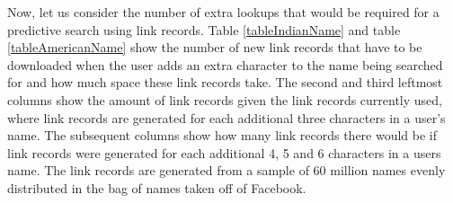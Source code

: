 Now, let us consider the number of extra lookups that would be required for a predictive search using link records. Table \ref{tableIndianName} and table \ref{tableAmericanName} show the number of new link records that have to be downloaded when the user adds an extra character to the name being searched for and how much space these link records take. The second and third leftmost columns show the amount of link records given the link records currently used, where link records are generated for each additional three characters in a user's name. The subsequent columns show how many link records there would be if link records were generated for each additional 4, 5 and 6 characters in a users name.
The link records are generated from a sample of 60 million names evenly distributed in the bag of names taken off of Facebook.

